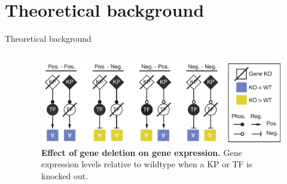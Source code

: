 \section{Theoretical background}
\begin{frame}{Theoretical background}
\begin{columns}
\begin{column}{0.5\textwidth}


\end{column}
\begin{column}{0.5\textwidth}
\begin{figure}[ht]
    \centering
    \includegraphics[width=\textwidth]{theory/fig/Fig1.pdf}
    \caption{\textbf{Effect of gene deletion on gene expression.} Gene expression levels relative to wildtype when a KP or TF is knocked out.}
    \label{fig:gene_deletion}
\end{figure}
\end{column}
\end{columns}
\end{frame}





% 



